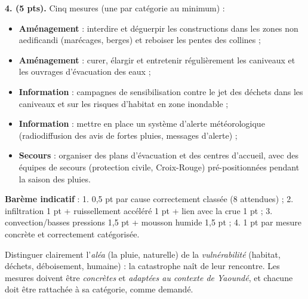 \documentclass[11pt]{article}
\begin{document}
\begin{corrige}
\textbf{4. (5 pts).} Cinq mesures (une par catégorie au minimum) :
\begin{itemize}
\item \textbf{Aménagement} : interdire et déguerpir les constructions dans les zones non aedificandi (marécages, berges) et reboiser les pentes des collines ;
\item \textbf{Aménagement} : curer, élargir et entretenir régulièrement les caniveaux et les ouvrages d'évacuation des eaux ;
\item \textbf{Information} : campagnes de sensibilisation contre le jet des déchets dans les caniveaux et sur les risques d'habitat en zone inondable ;
\item \textbf{Information} : mettre en place un système d'alerte météorologique (radiodiffusion des avis de fortes pluies, messages d'alerte) ;
\item \textbf{Secours} : organiser des plans d'évacuation et des centres d'accueil, avec des équipes de secours (protection civile, Croix-Rouge) pré-positionnées pendant la saison des pluies.
\end{itemize}

\textbf{Barème indicatif} : 1. 0,5 pt par cause correctement classée (8 attendues) ; 2. infiltration 1 pt + ruissellement accéléré 1 pt + lien avec la crue 1 pt ; 3. convection/basses pressions 1,5 pt + mousson humide 1,5 pt ; 4. 1 pt par mesure concrète et correctement catégorisée.
\end{corrige}

\begin{attention}
Distinguer clairement l'\emph{aléa} (la pluie, naturelle) de la \emph{vulnérabilité} (habitat, déchets, déboisement, humaine) : la catastrophe naît de leur rencontre. Les mesures doivent être \emph{concrètes} et \emph{adaptées au contexte de Yaoundé}, et chacune doit être rattachée à sa catégorie, comme demandé.
\end{attention}
\end{document}
